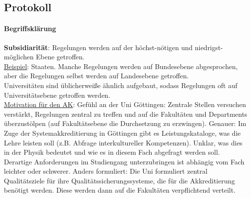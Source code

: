   \subsection*{Protokoll}
      \paragraph{Begriffsklärung}

    \textbf{Subsidiarität}: Regelungen werden auf der höchst-nötigen und niedrigst-möglichen Ebene getroffen. \\
    \underline{Beispiel}: Staaten. Manche Regelungen werden auf Bundesebene abgesprochen, aber die Regelungen selbst werden auf Landesebene getroffen. \\

    Universitäten sind üblicherweiße ähnlich aufgebaut, sodass Regelungen oft auf Universitätsebene getroffen werden. \\

    \underline{Motivation für den AK}: Gefühl an der Uni Göttingen: Zentrale Stellen versuchen verstärkt, Regelungen zentral zu treffen und auf die Fakultäten und Departments überzustölpen (auf Fakultätsebene die Durchsetzung zu erzwingen). Genauer: Im Zuge der Systemakkreditierung in Göttingen gibt es Leistungskataloge, was die Lehre leisten soll (z.B. Abfrage interkultureller Kompetenzen). Unklar, was dies in der Physik bedeutet und wie es in diesem Fach abgefragt werden soll. Derartige Anforderungen im Studiengang unterzubringen ist abhängig vom Fach leichter oder schwerer. Anders formuliert: Die Uni formuliert zentral Qualitätsziele für ihre Qualitätssicherungssysteme, die für die Akkreditierung benötigt werden. Diese werden dann auf die Fakultäten verpflichtend verteilt.

